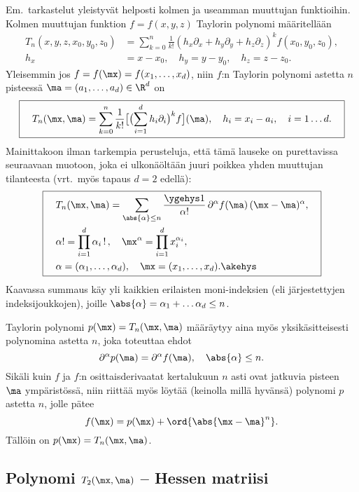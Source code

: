 Em.\ tarkastelut yleistyvät helposti kolmen ja useamman muuttujan funktioihin. Kolmen muuttujan
funktion $f=f(x,y,z)$ Taylorin polynomi määritellään
\begin{align*}
T_n(x,y,z,x_0,y_0,z_0) 
    &= \sum_{k=0}^n \frac{1}{k!}(h_x\partial_x+h_y\partial_y+h_z\partial_z)^kf(x_0,y_0,z_0), \\
h_x &= x-x_0,\quad h_y=y-y_0,\quad h_z=z-z_0.
\end{align*}
Yleisemmin jos $f=f(\mx)=f(x_1,\ldots,x_d)$, niin $f$:n Taylorin polynomi astetta $n$ pisteessä 
$\ma=(a_1,\ldots,a_d)\in\R^d$ on
\[ \boxed{
\quad T_n(\mx,\ma)
  =\sum_{k=0}^n\frac{1}{k!}\bigl[\bigl(\sum_{i=1}^d h_i\partial_i\bigr)^kf\bigr](\ma),\quad
                               h_i=x_i-a_i,\quad i=1\ldots d. \quad}
\]
Mainittakoon ilman tarkempia perusteluja, että tämä lauseke on purettavissa seuraavaan muotoon,
joka ei ulkonäöltään juuri poikkea yhden muuttujan tilanteesta
(vrt.\ myös tapaus $d=2$ edellä):
\[ \boxed{ \begin{aligned}
\quad &T_n(\mx,\ma)=\sum_{\abs{\alpha}\le n}\frac{\ygehys 1}{\alpha !}\,
                             \partial^\alpha f(\ma)\,(\mx-\ma)^\alpha, \quad \\
      &\alpha ! = \prod_{i=1}^d \alpha_i\,!\,, \quad 
                  \mx^\alpha = \prod_{i=1}^d x_i^{\alpha_i}, \\
      &\alpha   = (\alpha_1, \ldots, \alpha_d), \quad \mx = (x_1, \ldots, x_d). \akehys
\end{aligned} } \]
Kaavassa summaus käy yli kaikkien erilaisten moni-indeksien 
(eli järjestettyjen indeksijoukkojen), joille $\abs{\alpha} = \alpha_1 + \ldots \alpha_d \le n$.

Taylorin polynomi  $p(\mx)=T_n(\mx,\ma)$ määräytyy aina myös yksikäsitteisesti polynomina 
astetta $n$, joka toteuttaa ehdot
\[
\partial^\alpha p(\ma)=\partial^\alpha f(\ma),\quad \abs{\alpha}\leq n.
\]
Sikäli kuin $f$ ja $f$:n osittaisderivaatat kertalukuun $n$ asti ovat jatkuvia pisteen $\ma$
ympäristössä, niin riittää myös löytää (keinolla millä hyvänsä) polynomi $p$ astetta $n$,
jolle pätee
\[ 
f(\mx) = p(\mx) + \ord{\abs{\mx-\ma}^n}.
\]
Tällöin on $p(\mx)=T_n(\mx,\ma)$.

\subsection*{Polynomi $T_2(\mx,\ma)$ -- Hessen matriisi}

